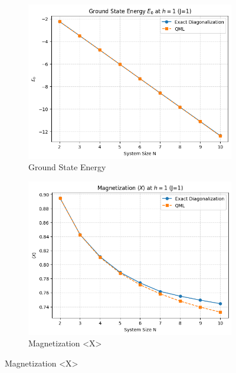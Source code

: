 \documentclass[a4paper]{article}
\begin{document}
\begin{figure}[htbp]
    \centering
    \begin{subfigure}[b]{0.32\textwidth} %
        \centering
        \includegraphics[width=\linewidth]{images/cmp_E.png} %
        \caption{Ground State Energy}
        \label{(a)}
    \end{subfigure}
    \hfill %
    \begin{subfigure}[b]{0.32\textwidth}
        \centering
        \includegraphics[width=\linewidth]{images/cmp_X.png} %
        \caption{Magnetization <X>}

\end{subfigure}
\end{figure}
\end{document}
